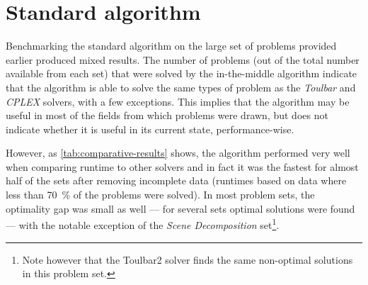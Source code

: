 \section{Standard algorithm}
Benchmarking the standard algorithm on the large set of problems provided earlier produced mixed results.
The number of problems (out of the total number available from each set) that were solved by the in-the-middle algorithm indicate that the algorithm is able to solve the same types of problem as the \emph{Toulbar} and \emph{CPLEX} solvers, with a few exceptions.
This implies that the algorithm may be useful in most of the fields from which problems were drawn, but does not indicate whether it is useful in its current state, performance-wise.

However, as \cref{tab:comparative-results} shows, the algorithm performed very well when comparing runtime to other solvers and in fact it was the fastest for almost half of the sets after removing incomplete data (runtimes based on data where less than \SI{70}{\percent} of the problems were solved).
In most problem sets, the optimality gap was small as well --- for several sets optimal solutions were found --- with the notable exception of the \emph{Scene Decomposition} set\footnote{Note however that the Toulbar2 solver finds the same non-optimal solutions in this problem set.}.


